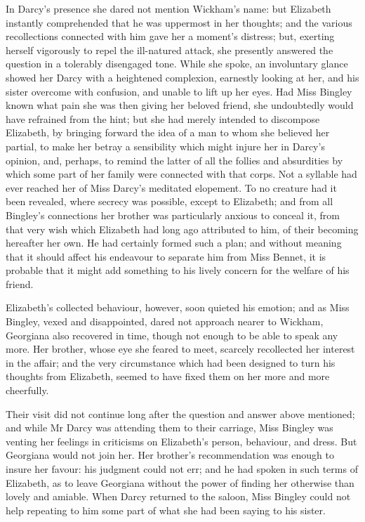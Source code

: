 In Darcy's presence she dared not mention Wickham's name: but Elizabeth instantly comprehended that he was uppermost in her thoughts; and the various recollections connected with him gave her a moment's distress; but, exerting herself vigorously to repel the ill-natured attack, she presently answered the question in a tolerably disengaged tone. While she spoke, an involuntary glance showed her Darcy with a heightened complexion, earnestly looking at her, and his sister overcome with confusion, and unable to lift up her eyes. Had Miss Bingley known what pain she was then giving her beloved friend, she undoubtedly would have refrained from the hint; but she had merely intended to discompose Elizabeth, by bringing forward the idea of a man to whom she believed her partial, to make her betray a sensibility which might injure her in Darcy's opinion, and, perhaps, to remind the latter of all the follies and absurdities by which some part of her family were connected with that corps. Not a syllable had ever reached her of Miss Darcy's meditated elopement. To no creature had it been revealed, where secrecy was possible, except to Elizabeth; and from all Bingley's connections her brother was particularly anxious to conceal it, from that very wish which Elizabeth had long ago attributed to him, of their becoming hereafter her own. He had certainly formed such a plan; and without meaning that it should affect his endeavour to separate him from Miss Bennet, it is probable that it might add something to his lively concern for the welfare of his friend.

Elizabeth's collected behaviour, however, soon quieted his emotion; and as Miss Bingley, vexed and disappointed, dared not approach nearer to Wickham, Georgiana also recovered in time, though not enough to be able to speak any more. Her brother, whose eye she feared to meet, scarcely recollected her interest in the affair; and the very circumstance which had been designed to turn his thoughts from Elizabeth, seemed to have fixed them on her more and more cheerfully.

Their visit did not continue long after the question and answer above mentioned; and while Mr Darcy was attending them to their carriage, Miss Bingley was venting her feelings in criticisms on Elizabeth's person, behaviour, and dress. But Georgiana would not join her. Her brother's recommendation was enough to insure her favour: his judgment could not err; and he had spoken in such terms of Elizabeth, as to leave Georgiana without the power of finding her otherwise than lovely and amiable. When Darcy returned to the saloon, Miss Bingley could not help repeating to him some part of what she had been saying to his sister.

